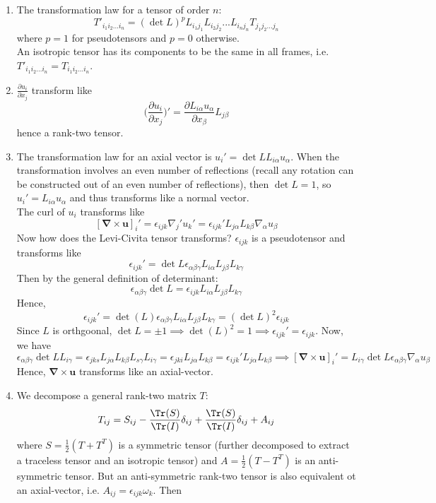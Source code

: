 \documentclass[a4paper]{article}
\begin{document}
\begin{ans}\leavevmode
\begin{enumerate}[label=(\roman*)]
\item The transformation law for a tensor of order $n$:
$$T'_{i_1i_2...i_n}=(\det L)^pL_{i_1j_1}L_{i_2j_2}...L_{i_nj_n}T_{j_1j_2...j_n}$$
where $p=1$ for pseudotensors and $p=0$ otherwise.\\[5pt]
An isotropic tensor has its components to be the same in all frames, i.e. $T'_{i_1i_2...i_n}=T_{i_1i_2...i_n}$.
\item $\frac{\partial u_i}{\partial x_j}$ transform like $$\bigg(\frac{\partial u_i}{\partial x_j}\bigg)'=\frac{\partial L_{i\alpha}u_\alpha}{\partial x_\beta}L_{j\beta}$$
hence a rank-two tensor.
\item The transformation law for an axial vector is $u_i'=\det L L_{i\alpha}u_\alpha$. When the transformation involves an even number of reflections (recall any rotation can be constructed out of an even number of reflections), then $\det L=1$, so $u_i'=L_{i\alpha}u_\alpha$ and thus transforms like a normal vector.\\[5pt]
The curl of $u_i$ transforms like
$$[\boldsymbol{\nabla}\times\mathbf{u}]_i'=\epsilon_{ijk}\nabla_j'u_k'=\epsilon_{ijk}'L_{j\alpha}L_{k\beta}\nabla_\alpha u_\beta$$
Now how does the Levi-Civita tensor transforms? $\epsilon_{ijk}$ is a pseudotensor and transforms like
$$\epsilon_{ijk}'=\det L\epsilon_{\alpha\beta\gamma}L_{i\alpha}L_{j\beta}L_{k\gamma}$$
Then by the general definition of determinant:
$$\epsilon_{\alpha\beta\gamma}\det L=\epsilon_{ijk}L_{i\alpha}L_{j\beta}L_{k\gamma}$$
Hence,
$$\epsilon_{ijk}'=\det(L)\epsilon_{\alpha\beta\gamma}L_{i\alpha}L_{j\beta}L_{k\gamma}=(\det L)^2\epsilon_{ijk}$$
Since $L$ is orthgoonal, $\det L=\pm1\implies\det(L)^2=1\implies\epsilon_{ijk}'=\epsilon_{ijk}$. Now, we have
$$\epsilon_{\alpha\beta\gamma}\det L L_{i\gamma}=\epsilon_{jks}L_{j\alpha}L_{k\beta}L_{s\gamma}L_{i\gamma}=\epsilon_{jki}L_{j\alpha}L_{k\beta}=\epsilon_{ijk}'L_{j\alpha}L_{k\beta}\implies[\boldsymbol{\nabla}\times\mathbf{u}]_i'=L_{i\gamma}\det L\epsilon_{\alpha\beta\gamma}\nabla_\alpha u_\beta$$
Hence, $\boldsymbol{\nabla}\times\mathbf{u}$ transforms like an axial-vector.
\item We decompose a general rank-two matrix $T$:
$$T_{ij}=S_{ij}-\frac{\Tr(S)}{\Tr(I)}\delta_{ij}+\frac{\Tr(S)}{\Tr(I)}\delta_{ij}+A_{ij}$$
where $S=\frac{1}{2}(T+T^T)$ is a symmetric tensor (further decomposed to extract a traceless tensor and an isotropic tensor) and $A=\frac{1}{2}(T-T^T)$ is an anti-symmetric tensor. But an anti-symmetric rank-two tensor is also equivalent ot an axial-vector, i.e. $A_{ij}=\epsilon_{ijk}\omega_k.$ Then

\end{enumerate}
\end{ans}
\end{document}
